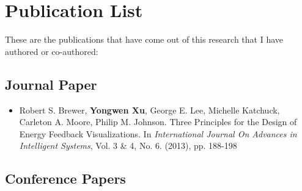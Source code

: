 \chapter{Publication List}
\label{app:publication-list}

These are the publications that have come out of this research that I have authored or co-authored:

\section{Journal Paper}

\begin{itemize}

\item Robert S. Brewer, \textbf{Yongwen Xu}, George E. Lee, Michelle Katchuck, Carleton A. Moore, Philip M. Johnson. Three Principles for the Design of Energy Feedback Visualizations. In   
\emph{International Journal On Advances in Intelligent Systems}, Vol. 3 \& 4, No. 6. (2013), pp. 188-198

\end{itemize}

\section{Conference Papers}

